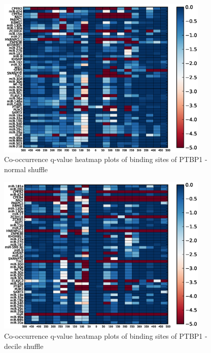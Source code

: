 \begin{figure}
   	\includegraphics[width=0.9\textwidth]{appendix1/figures/PTBP1_AUcontent_expressed_heatmap_qvalues0.eps}
   	\caption{Co-occurrence q-value heatmap plots of binding sites of PTBP1 - normal shuffle}
\end{figure}
\clearpage
\begin{figure}
	\includegraphics[width=0.9\textwidth]{appendix1/figures/PTBP1_decile_expressed_heatmap_qvalues0.eps}
	\caption{Co-occurrence q-value heatmap plots of binding sites of PTBP1 - decile shuffle}
\end{figure}

